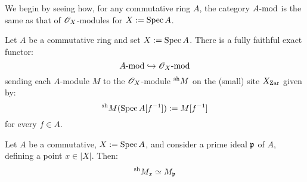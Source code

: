         We begin by seeing how, for any commutative ring $A$, the category $A\mod$ is the same as that of $\scrO_X$-modules for $X := \Spec A$. 
        \begin{lemma} \label{lemma: sheafifying_modules}
            Let $A$ be a commutative ring and set $X := \Spec A$. There is a fully faithful exact functor:
                $$A\mod \hookrightarrow \scrO_X\mod$$
            sending each $A$-module $M$ to the $\scrO_X$-module ${}^{\sh}M$ on the (small) site $X_{\Zar}$ given by:
                $${}^{\sh}M(\Spec A[f^{-1}]) := M[f^{-1}]$$
            for every $f \in A$. 
        \end{lemma}
        \begin{corollary}
            Let $A$ be a commutative, $X := \Spec A$, and consider a prime ideal $\p$ of $A$, defining a point $x \in |X|$. Then:
                $${}^{\sh}M_x \cong M_{\p}$$
        \end{corollary}
        
